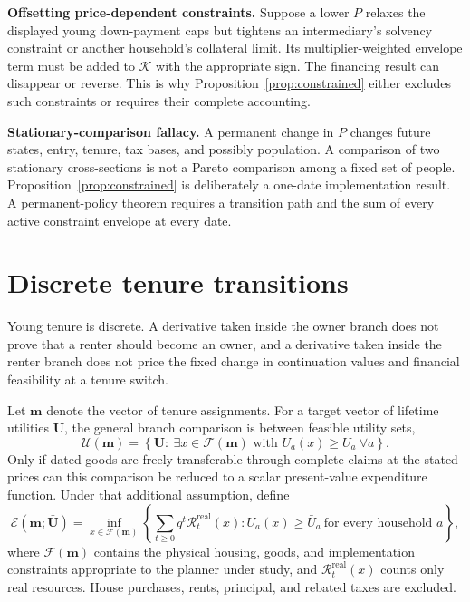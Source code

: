\documentclass[11pt]{article}
\newcommand{\1}{\mathbf 1}
\begin{document}
\textbf{Offsetting price-dependent constraints.} Suppose a lower $P$ relaxes
the displayed young down-payment caps but tightens an intermediary's solvency
constraint or another household's collateral limit. Its multiplier-weighted
envelope term must be added to $\mathcal K$ with the appropriate sign. The
financing result can disappear or reverse. This is why
Proposition~\ref{prop:constrained} either excludes such constraints or requires
their complete accounting.

\textbf{Stationary-comparison fallacy.} A permanent change in $P$ changes
future states, entry, tenure, tax bases, and possibly population. A comparison
of two stationary cross-sections is not a Pareto comparison among a fixed set
of people. Proposition~\ref{prop:constrained} is deliberately a one-date
implementation result. A permanent-policy theorem requires a transition path
and the sum of every active constraint envelope at every date.

\section{Discrete tenure transitions}
\label{sec:tenure}

Young tenure is discrete. A derivative taken inside the owner branch does not
prove that a renter should become an owner, and a derivative taken inside the
renter branch does not price the fixed change in continuation values and
financial feasibility at a tenure switch.

Let $\mathbf m$ denote the vector of tenure assignments. For a target vector of
lifetime utilities $\bar{\mathbf U}$, the general branch comparison is between
feasible utility sets,
\begin{equation}
\mathcal U(\mathbf m)
=\left\{\mathbf U:\ \exists x\in\mathcal F(\mathbf m)
\text{ with }U_a(x)\ge U_a\ \forall a\right\}.
\label{eq:branch_utility_set}
\end{equation}
Only if dated goods are freely transferable through complete claims at the
stated prices can this comparison be reduced to a scalar present-value
expenditure function. Under that additional assumption, define
\begin{equation}
\mathcal E(\mathbf m;\bar{\mathbf U})
=\inf_{x\in\mathcal F(\mathbf m)}
\left\{\sum_{t\ge0}q^t \mathcal R_t^{\mathrm{real}}(x):
U_a(x)\ge\bar U_a\ \text{for every household }a\right\},
\label{eq:branch_expenditure}
\end{equation}
where $\mathcal F(\mathbf m)$ contains the physical housing, goods, and
implementation constraints appropriate to the planner under study, and
$\mathcal R_t^{\mathrm{real}}(x)$ counts only real resources. House purchases,
rents, principal, and rebated taxes are excluded.
\end{document}
